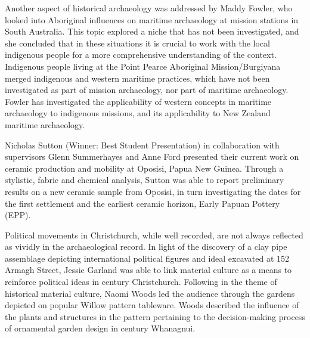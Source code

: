 Another aspect of historical archaeology was addressed by Maddy Fowler, who looked into Aboriginal influences on maritime archaeology at mission stations in South Australia. This topic explored a niche that has not been investigated, and she concluded that in these situations it is crucial to work with the local indigenous people for a more comprehensive understanding of the context. Indigenous people living at the Point Pearce Aboriginal Mission/Burgiyana merged indigenous and western maritime practices, which have not been investigated as part of mission archaeology, nor part of maritime archaeology. Fowler has investigated the applicability of western concepts in maritime archaeology to indigenous missions, and its applicability to New Zealand maritime archaeology.


Nicholas Sutton (Winner: Best Student Presentation) in collaboration with supervisors Glenn Summerhayes and Anne Ford presented their current work on ceramic production and mobility at Oposisi, Papua New Guinea. Through a stylistic, fabric and chemical analysis, Sutton was able to report preliminary results on a new ceramic sample from Oposisi, in turn investigating the dates for the first settlement and the earliest ceramic horizon, Early Papuan Pottery (EPP).  

Political movements in Christchurch, while well recorded, are not always reflected as vividly in the archaeological record. In light of the discovery of a clay pipe assemblage depicting international political figures and ideal excavated at 152 Armagh Street, Jessie Garland was able to link material culture as a means to reinforce political ideas in  century Christchurch. Following in the theme of historical material culture, Naomi Woods led the audience through the gardens depicted on popular Willow pattern tableware. Woods described the influence of the plants and structures in the pattern pertaining to the decision-making process of ornamental garden design in  century Whanagnui. 



\label{NZAA:lastpage}
\closingarticle